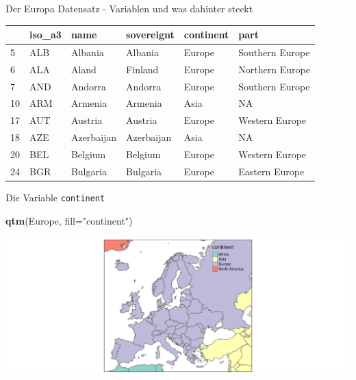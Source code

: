 \documentclass[ignorenonframetext,]{beamer}
\newenvironment{Shaded}{\begin{snugshade}}{\end{snugshade}}
\newcommand{\DataTypeTok}[1]{\textcolor[rgb]{0.13,0.29,0.53}{#1}}
\newcommand{\KeywordTok}[1]{\textcolor[rgb]{0.13,0.29,0.53}{\textbf{#1}}}
\newcommand{\NormalTok}[1]{#1}
\newcommand{\StringTok}[1]{\textcolor[rgb]{0.31,0.60,0.02}{#1}}
\begin{document}
\begin{frame}{Der Europa Datensatz - Variablen und was dahinter steckt}
\protect\hypertarget{der-europa-datensatz---variablen-und-was-dahinter-steckt}{}

\begin{longtable}[]{@{}llllll@{}}
\toprule
& iso\_a3 & name & sovereignt & continent & part\tabularnewline
\midrule
\endhead
5 & ALB & Albania & Albania & Europe & Southern Europe\tabularnewline
6 & ALA & Aland & Finland & Europe & Northern Europe\tabularnewline
7 & AND & Andorra & Andorra & Europe & Southern Europe\tabularnewline
10 & ARM & Armenia & Armenia & Asia & NA\tabularnewline
17 & AUT & Austria & Austria & Europe & Western Europe\tabularnewline
18 & AZE & Azerbaijan & Azerbaijan & Asia & NA\tabularnewline
20 & BEL & Belgium & Belgium & Europe & Western Europe\tabularnewline
24 & BGR & Bulgaria & Bulgaria & Europe & Eastern Europe\tabularnewline
\bottomrule
\end{longtable}

\end{frame}

\begin{frame}[fragile]{Die Variable \texttt{continent}}
\protect\hypertarget{die-variable-continent}{}

\begin{Shaded}
\begin{Highlighting}[]
\KeywordTok{qtm}\NormalTok{(Europe, }\DataTypeTok{fill=}\StringTok{"continent"}\NormalTok{)}
\end{Highlighting}
\end{Shaded}

\includegraphics{A4_tmap_files/figure-beamer/unnamed-chunk-15-1.pdf}

\end{frame}
\end{document}

